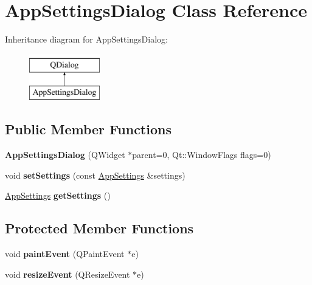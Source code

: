 \hypertarget{class_app_settings_dialog}{\section{App\-Settings\-Dialog Class Reference}
\label{class_app_settings_dialog}
}
Inheritance diagram for App\-Settings\-Dialog\-:\begin{figure}[H]
\begin{center}
\leavevmode
\includegraphics[height=2.000000cm]{class_app_settings_dialog}
\end{center}
\end{figure}
\subsection*{Public Member Functions}
\begin{DoxyCompactItemize}
\item 
\hypertarget{class_app_settings_dialog_a39223cd3b37d3b8109719f9203f8b418}{{\bfseries App\-Settings\-Dialog} (Q\-Widget $\ast$parent=0, Qt\-::\-Window\-Flags flags=0)}\label{class_app_settings_dialog_a39223cd3b37d3b8109719f9203f8b418}

\item 
\hypertarget{class_app_settings_dialog_a26910a01c64bbeff34d305e2e716f33b}{void {\bfseries set\-Settings} (const \hyperlink{class_app_settings}{App\-Settings} \&settings)}\label{class_app_settings_dialog_a26910a01c64bbeff34d305e2e716f33b}

\item 
\hypertarget{class_app_settings_dialog_aca089660188286cfc0059334ff814060}{\hyperlink{class_app_settings}{App\-Settings} {\bfseries get\-Settings} ()}\label{class_app_settings_dialog_aca089660188286cfc0059334ff814060}

\end{DoxyCompactItemize}
\subsection*{Protected Member Functions}
\begin{DoxyCompactItemize}
\item 
\hypertarget{class_app_settings_dialog_a5b5082d3e93c319e64128cc719cd28fa}{void {\bfseries paint\-Event} (Q\-Paint\-Event $\ast$e)}\label{class_app_settings_dialog_a5b5082d3e93c319e64128cc719cd28fa}

\item 
\hypertarget{class_app_settings_dialog_aa22fc019a46dea565b6a20aa5a4255a3}{void {\bfseries resize\-Event} (Q\-Resize\-Event $\ast$e)}\label{class_app_settings_dialog_aa22fc019a46dea565b6a20aa5a4255a3}

\end{DoxyCompactItemize}


